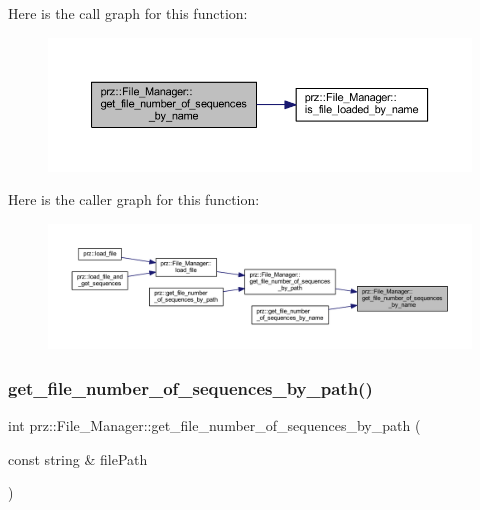 Here is the call graph for this function\+:
\nopagebreak
\begin{figure}[H]
\begin{center}
\leavevmode
\includegraphics[width=350pt]{classprz_1_1_file___manager_abdabf8d32f9cca2d8cda41cdd7841312_cgraph}
\end{center}
\end{figure}
Here is the caller graph for this function\+:
\nopagebreak
\begin{figure}[H]
\begin{center}
\leavevmode
\includegraphics[width=350pt]{classprz_1_1_file___manager_abdabf8d32f9cca2d8cda41cdd7841312_icgraph}
\end{center}
\end{figure}
\mbox{\label{classprz_1_1_file___manager_a14c8b3151837fbb69614eb30499c534a}} 
\subsubsection{\texorpdfstring{get\_file\_number\_of\_sequences\_by\_path()}{get\_file\_number\_of\_sequences\_by\_path()}}
{\footnotesize\ttfamily int prz\+::\+File\+\_\+\+Manager\+::get\+\_\+file\+\_\+number\+\_\+of\+\_\+sequences\+\_\+by\+\_\+path (\begin{DoxyParamCaption}\item[{const string \&}]{file\+Path }\end{DoxyParamCaption})}



